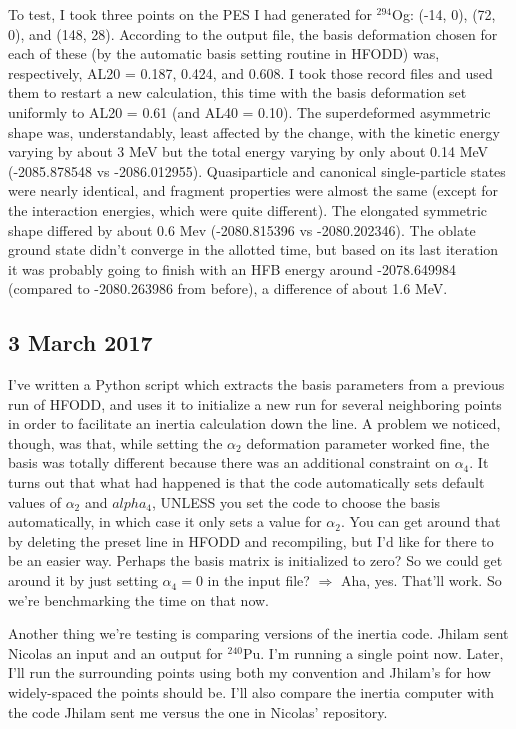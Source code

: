 \documentclass[]{report}
\begin{document}
To test, I took three points on the PES I had generated for $^{294}$Og: (-14, 0), (72, 0), and (148, 28). According to the output file, the basis deformation chosen for each of these (by the automatic basis setting routine in HFODD) was, respectively, AL20 = 0.187, 0.424, and 0.608. I took those record files and used them to restart a new calculation, this time with the basis deformation set uniformly to AL20 = 0.61 (and AL40 = 0.10). The superdeformed asymmetric shape was, understandably, least affected by the change, with the kinetic energy varying by about 3 MeV but the total energy varying by only about 0.14 MeV (-2085.878548 vs -2086.012955). Quasiparticle and canonical single-particle states were nearly identical, and fragment properties were almost the same (except for the interaction energies, which were quite different). The elongated symmetric shape differed by about 0.6 Mev (-2080.815396 vs -2080.202346). The oblate ground state didn't converge in the allotted time, but based on its last iteration it was probably going to finish with an HFB energy around -2078.649984 (compared to -2080.263986 from before), a difference of about 1.6 MeV.

\subsection*{3 March 2017}
I've written a Python script which extracts the basis parameters from a previous run of HFODD, and uses it to initialize a new run for several neighboring points in order to facilitate an inertia calculation down the line. A problem we noticed, though, was that, while setting the $\alpha_2$ deformation parameter worked fine, the basis was totally different because there was an additional constraint on $\alpha_4$. It turns out that what had happened is that the code automatically sets default values of $\alpha_2$ and $alpha_4$, UNLESS you set the code to choose the basis automatically, in which case it only sets a value for $\alpha_2$. You can get around that by deleting the preset line in HFODD and recompiling, but I'd like for there to be an easier way. Perhaps the basis matrix is initialized to zero? So we could get around it by just setting $\alpha_4=0$ in the input file? $\Rightarrow$ Aha, yes. That'll work. So we're benchmarking the time on that now.

Another thing we're testing is comparing versions of the inertia code. Jhilam sent Nicolas an input and an output for $^{240}$Pu. I'm running a single point now. Later, I'll run the surrounding points using both my convention and Jhilam's for how widely-spaced the points should be. I'll also compare the inertia computer with the code Jhilam sent me versus the one in Nicolas' repository.
\end{document}
